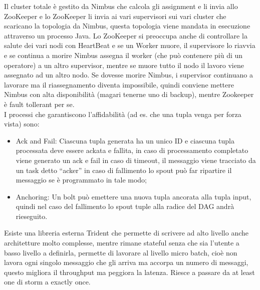 \documentclass[11pt, twocolumn]{article}
\newenvironment{myitemize}
{ \begin{itemize}[topsep=0ex]
		\setlength{\itemsep}{0pt}
		\setlength{\parskip}{0pt}
		\setlength{\parsep}{0pt}     }
	{ \end{itemize}                  }
\begin{document}
Il cluster totale è gestito da Nimbus che calcola gli assignment e li invia allo ZooKeeper e lo ZooKeeper li invia ai vari supervisori sui vari cluster che scaricano la topologia da Nimbus, questa topologia viene mandata in esecuzione attraverso un processo Java. 
Lo ZooKeeper si preoccupa anche di controllare la salute dei vari nodi con HeartBeat e se un Worker muore, il supervisore lo riavvia e se continua a morire Nimbus assegna il worker (che può contenere più di un operatore) a un altro supervisor, mentre se muore tutto il nodo il lavoro viene assegnato ad un altro nodo. Se dovesse morire Nimbus, i supervisor continuano a lavorare ma il riassegnamento diventa impossibile, quindi conviene mettere Nimbus con alta disponibilità (magari tenerne uno di backup), mentre Zookeeper è fault tollerant per se.\\
I processi che garantiscono l'affidabilità (ad es. che una tupla venga per forza vista) sono:
\begin{myitemize}
	\item Ack and Fail: Ciascuna tupla generata ha un unico ID e ciascuna tupla processata deve essere ackata e fallita, in caso di processamento completato viene generato un ack e fail in caso di timeout, il messaggio viene tracciato da un task detto ``acker'' in caso di fallimento lo spout può far ripartire il messaggio se è programmato in tale modo;
	\item Anchoring: Un bolt può emettere una nuova tupla ancorata alla tupla input, quindi nel caso del fallimento lo spout tuple alla radice del DAG andrà rieseguito.
\end{myitemize}
Esiste una libreria esterna Trident che permette di scrivere ad alto livello anche architetture molto complesse, mentre rimane stateful senza che sia l'utente a basso livello a definirla, permette di lavorare al livello micro batch, cioè non lavora ogni singolo messaggio che gli arriva ma accorpa un numero di messaggi, questo migliora il throughput ma peggiora la latenza.
Riesce a passare da at least one di storm a exactly once.
\end{document}
